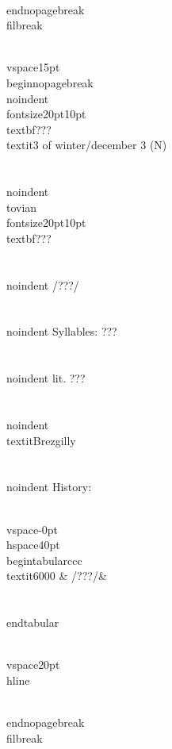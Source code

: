 \\end{nopagebreak}
\\filbreak



\\vspace{15pt}
\\begin{nopagebreak}
\\noindent{\\fontsize{20pt}{10pt}\\textbf{???} } \\textit{3 of winter/december 3} (N)\\\\
\\noindent {\\tovian \\fontsize{20pt}{10pt} \\textbf{???} }\\\\
\\noindent /???/\\\\
\\noindent Syllables: ???\\\\
\\noindent lit. ???\\\\
\\noindent \\textit{Brezgilly}\\\\


\\noindent History:

\\vspace{-0pt}
\\hspace{40pt}
\\begin{tabular}{ccc}
\\textit{6000} & /???/& \\\\
\\end{tabular}

\\vspace{20pt}\\hline

\\end{nopagebreak}
\\filbreak



